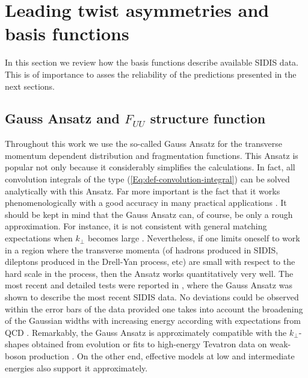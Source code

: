 \documentclass[a4paper,11pt]{article}
\def\kperp{k_\perp}
\begin{document}
\section{Leading twist asymmetries and basis functions}
\label{Sec-5:twist-2+basis}
In this section we review how the basis functions describe available
SIDIS data. This is of importance to asses the reliability of the
predictions presented in the next sections.

\subsection{\boldmath Gauss Ansatz and $F_{UU}$ structure function}
\label{Sec-5.1:FUU-basis}

Throughout this work we use the so-called Gauss Ansatz for the
transverse momentum dependent distribution and fragmentation functions. 
This Ansatz is popular not only because it considerably simplifies the
calculations. In fact, all convolution integrals of the type 
(\ref{Eq:def-convolution-integral}) can be solved analytically with 
this Ansatz.
Far more important is the fact that it works phenomenologically
with a good accuracy in many practical applications
\cite{Anselmino:2005nn,Collins:2005ie,D'Alesio:2007jt,Schweitzer:2010tt,
Signori:2013mda,Anselmino:2013lza}.
It should be kept in mind that the Gauss Ansatz can, of course, 
be only a rough approximation. For instance, it is not 
consistent with general matching expectations when $\kperp$ 
becomes large \cite{Bacchetta:2008xw}. Nevertheless, if
one limits oneself to work in a region where the transverse
momenta (of hadrons produced in SIDIS,  dileptons produced
in the Drell-Yan process, etc) are small with respect to the hard
scale in the process, then the Ansatz works quantitatively
very well. The most recent and detailed tests were reported in 
\cite{Schweitzer:2010tt}, where the Gauss Ansatz was shown to
describe the most recent SIDIS data. No deviations could
be observed within the error bars of the data provided one
takes into account the broadening of the Gaussian widths
with increasing energy \cite{Schweitzer:2010tt} according
with expectations from QCD \cite{Aybat:2011zv}.
Remarkably, the Gauss Ansatz is approximately compatible with 
the $\kperp$-shapes obtained from evolution \cite{Aybat:2011zv}
or fits to high-energy Tevatron data on weak-boson production
\cite{Landry:2002ix}. On the other end, effective models at 
low \cite{Pasquini:2008ax,Avakian:2010br} and intermediate 
\cite{Efremov:2009ze} energies also support it approximately.
\end{document}
